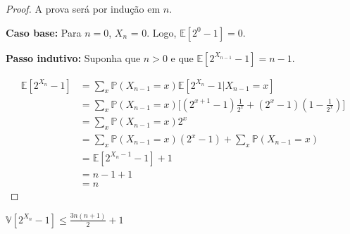 \begin{proof}
A prova será por indução em $n$. 

\textbf{Caso base:} Para $n = 0$, $X_n$ = 0. Logo, $\mathbb{E}[2^0 - 1] = 0$.

\textbf{Passo indutivo:} Suponha que $n > 0$ e que $\mathbb{E}[2^{X_{n-1}} - 1] = n-1$.

\begin{align*}
  \mathbb{E}[2^{X_n} - 1] 
    &= \sum_{x} \mathbb{P} (X_{n-1} = x) \mathbb{E}[2^{X_n} - 1 | X_{n-1} = x] \\
    &= \sum_{x} \mathbb{P} (X_{n-1} = x) \Big[ (2^{x+1} - 1) \frac{1}{2^x} +  (2^x - 1) (1 - \frac{1}{2^x}) \Big] \\
    &= \sum_{x} \mathbb{P} (X_{n-1} = x) 2^x \\
    &= \sum_{x} \mathbb{P} (X_{n-1} = x) (2^x - 1) + \sum_{x} \mathbb{P} (X_{n-1} = x) \\
    &= \mathbb{E}[2^{X_n-1} - 1] + 1 \\
    &= n - 1 + 1 \\
    &= n
\end{align*}

\end{proof}

\begin{lemma} \label{morris:variance}
$\mathbb{V}[2^{X_n} - 1] \leq \frac{3n(n+1)}{2} + 1$
\end{lemma}

